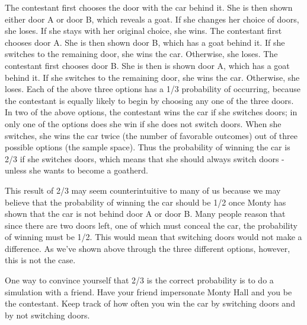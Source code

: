 The contestant first chooses the door with the car behind it. She is then shown either door A or door B, which reveals a goat. If she changes her choice of doors, she loses. If she stays with her original choice, she wins.
The contestant first chooses door A. She is then shown door B, which has a goat behind it. If she switches to the remaining door, she wins the car. Otherwise, she loses.
The contestant first chooses door B. She is then is shown door A, which has a goat behind it. If she switches to the remaining door, she wins the car. Otherwise, she loses.
Each of the above three options has a 1/3 probability of occurring, because the contestant is equally likely to begin by choosing any one of the three doors. In two of the above options, the contestant wins the car if she switches doors; in only one of the options does she win if she does not switch doors. When she switches, she wins the car twice (the number of favorable outcomes) out of three possible options (the sample space). Thus the probability of winning the car is 2/3 if she switches doors, which means that she should always switch doors - unless she wants to become a goatherd.

This result of 2/3 may seem counterintuitive to many of us because we may believe that the probability of winning the car should be 1/2 once Monty has shown that the car is not behind door A or door B. Many people reason that since there are two doors left, one of which must conceal the car, the probability of winning must be 1/2. This would mean that switching doors would not make a difference. As we've shown above through the three different options, however, this is not the case.

One way to convince yourself that 2/3 is the correct probability is to do a simulation with a friend. Have your friend impersonate Monty Hall and you be the contestant. Keep track of how often you win the car by switching doors and by not switching doors.



